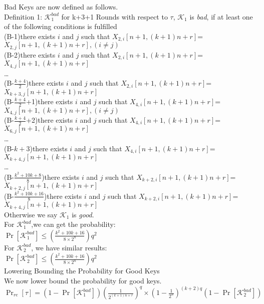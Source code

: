 \documentclass{article}
\begin{document}
Bad Keys are now defined as follows.\\
Definition 1: $\mathcal{K}_{1}^{bad}$  for k+3+1 Rounds
with respect to $\tau$, $\mathcal{K}_{1}$  is {\it bad}, if at least one of the following conditions is fulfilled\\
(B-1)there exists $i$ and $j$ such that $X_{2,i}[n+1,(k+1)n+r]$=$X_{2,j}[n+1,(k+1)n+r],(i\neq j)$\\
(B-2)there exists $i$ and $j$ such that $X_{2,i}[n+1,(k+1)n+r]$=$X_{4,j}[n+1,(k+1)n+r]$\\
\dots\\
(B-$\frac{k+4}{2}$)there exists $i$ and $j$ such that $X_{2,i}[n+1,(k+1)n+r]$=$X_{k+3,j}[n+1,(k+1)n+r]$\\
(B-$\frac{k+4}{2}$+1)there exists $i$ and $j$ such that $X_{4,i}[n+1,(k+1)n+r]$=$X_{4,j}[n+1,(k+1)n+r],(i\neq j)$\\
(B-$\frac{k+4}{2}$+2)there exists $i$ and $j$ such that $X_{4,i}[n+1,(k+1)n+r]$=$X_{6,j}[n+1,(k+1)n+r]$\\
\dots \\
(B-$k+3$)there exists $i$ and $j$ such that $X_{4,i}[n+1,(k+1)n+r]$=$X_{k+4,j}[n+1,(k+1)n+r]$\\
\dots \\
(B-$\frac{k^{2}+10k+8}{8}$)there exists $i$ and $j$ such that $X_{k+2,i}[n+1,(k+1)n+r]$=$X_{k+2,j}[n+1,(k+1)n+r]$\\
(B-$\frac{k^{2}+10k+16}{8}$)there exists $i$ and $j$ such that $X_{k+2,i}[n+1,(k+1)n+r]$=$X_{k+4,j}[n+1,(k+1)n+r]$\\
Otherwise we say $\mathcal{K}_{1}$ is {\it good}.\\

For $\mathcal{K}_{1}^{bad}$,we can get the probability:\\
$\Pr[\mathcal{K}_{1}^{bad}]\leq (\frac{k^{2}+10k+16}{8\times2^{n}})q^{2}$\\

For $\mathcal{K}_{2}^{bad}$, we have similar results:\\
$\Pr[\mathcal{K}_{2}^{bad}]\leq (\frac{k^{2}+10k+16}{8\times2^{n}})q^{2}$\\

Lowering Bounding the Probability for Good Keys\\
We now lower bound the probability for good keys.\\
$\Pr_{re}[\tau]=(1-\Pr[\mathcal{K}_{1}^{bad}])(\frac{1}{2^{(k+1)n+r}})^{q}\times(1-\frac{1}{2^{n}})^{(k+2)q}
(1-\Pr[\mathcal{K}_{2}^{bad}])$
\end{document}
